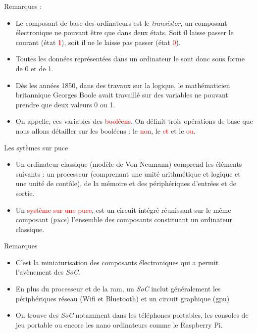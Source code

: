 \documentclass[10pt]{beamer}
\begin{document}
\begin{frame}
	\mframe{\Arch}
	\begin{block}{Remarques :}
		\begin{itemize}[label=\textbullet]
			\item<1-> Le composant de base des ordinateurs est le \textit{transistor}, un composant électronique ne pouvant être que dans deux états. Soit il laisse passer le courant (état \textcolor{red}{1}), soit il ne le laisse pas passer (état \textcolor{red}{0}).
			\item<2-> Toutes les données représentées dans un ordinateur le sont donc sous forme de 0 et de 1.
			\item<3-> Dès les années 1850, dans des travaux sur la logique, le mathématicien britannique Georges Boole avait travaillé sur des variables ne pouvant prendre que deux valeurs 0  ou 1.
			\item<4-> On appelle, ces variables des \textcolor{red}{booléens}. On définit trois opérations de base que nous allons détailler sur les booléens : le \textcolor{red}{non}, le \textcolor{red}{et} et le \textcolor{red}{ou}.
		\end{itemize}
	\end{block}
\end{frame}



\begin{frame}{\SOC}
	\mframe{\SOC}
	\begin{alertblock}{Les sytèmes sur puce}
		\begin{itemize}[label=\textbullet]
			\item<1-> Un ordinateur classique (modèle de Von Neumann) comprend les éléments suivants : un processeur (comprenant une unité arithmétique et logique et une unité de contôle), de la mémoire et des périphériques d'entrées et de sortie.
			\item<2-> Un \textcolor{red}{système sur une puce}, est un circuit intégré réunissant sur le même composant (\textit{puce}) l'ensemble des composants constituant un ordinateur classique.
		\end{itemize}
	\end{alertblock}
	\begin{block}{Remarques}
		\begin{itemize}[label=\textbullet]
			\item<3-> C'est la miniaturisation des composants électroniques qui a permit l'avènement des \textit{SoC}.
			\item<4-> En plus du processeur et de la {\sc ram}, un \textit{SoC} inclut généralement les périphériques réseau (Wifi et Bluetooth) et un circuit graphique ({\sc gpu})
			\item<5-> On trouve des \textit{SoC} notamment dans les téléphones portables, les consoles de jeu portable ou encore les nano ordinateurs comme le Raspberry Pi.
		\end{itemize}
	\end{block}
\end{frame}
\end{document}
